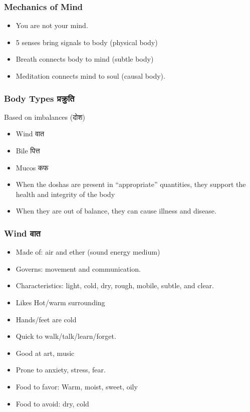 \begin{frame}[fragile]\frametitle{Mechanics of Mind}
	\begin{itemize}
	\item You are not your mind.
	\item 5 senses bring signals to body (physical body)
	\item Breath connects body to mind (subtle body)
	\item Meditation connects mind to soul (causal body).
	\end{itemize}
\end{frame}



\begin{frame}[fragile]\frametitle{Body Types प्रक्रुति}
Based on imbalances (दोश)

	\begin{itemize}
	\item  Wind वात
	\item  Bile पित्त
	\item  Mucos कफ
	\item When the doshas are present in ``appropriate'' quantities, they support the health and integrity of the body
	\item When they are out of balance, they can cause illness and disease.
	\end{itemize}

\end{frame}

\begin{frame}[fragile]\frametitle{Wind वात}

	\begin{itemize}
	\item Made of: air and ether (sound energy medium)
	\item Governs: movement and communication.
	\item Characteristics: light, cold, dry, rough, mobile, subtle, and clear.	
	\item Likes Hot/warm surrounding
	\item Hands/feet are cold
	\item Quick to walk/talk/learn/forget.
	\item Good at art, music
	\item Prone to anxiety, stress, fear.
	\item Food to favor: Warm, moist, sweet, oily
	\item Food to avoid: dry, cold
	\end{itemize}

\end{frame}

